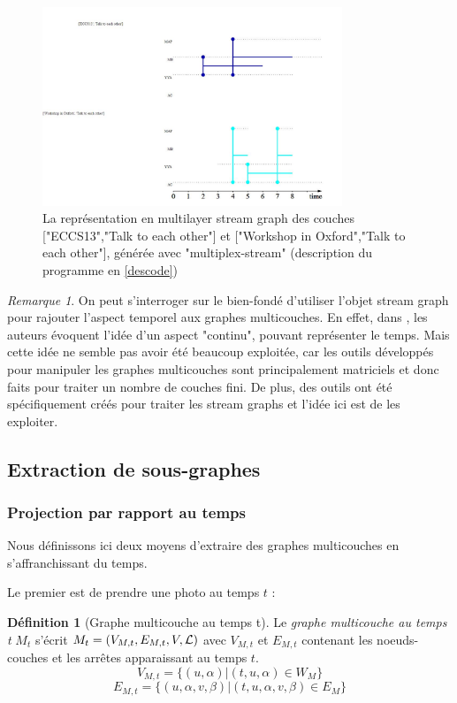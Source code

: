\documentclass[11pt,a4paper]{article}
\theoremstyle{definition}
\newtheorem{defn}{Définition}
\theoremstyle{remark}
\newtheorem{rmq}{Remarque}
\theoremstyle{remark}
\begin{document}
	\begin{figure}[H]
		\centering
		\includegraphics[width=0.8\textwidth]{exMultiStream.JPG}
		\caption{La représentation en multilayer stream graph des couches ["ECCS13","Talk to each other"] et ["Workshop in Oxford","Talk to each other"], générée avec "multiplex-stream" (description du programme en \cref{descode})}
	\end{figure}
	
	\begin{rmq}
		On peut s'interroger sur le bien-fondé d'utiliser l'objet stream graph pour rajouter l'aspect temporel aux graphes multicouches. En effet, dans \cite{mlkiv}, les auteurs évoquent l'idée d'un aspect "continu", pouvant représenter le temps. Mais cette idée ne semble pas avoir été beaucoup exploitée, car les outils développés pour manipuler les graphes multicouches sont principalement matriciels et donc faits pour traiter un nombre de couches fini. De plus, des outils ont été spécifiquement créés pour traiter les stream graphs et l'idée ici est de les exploiter.
	
	\end{rmq}

\subsection{Extraction de sous-graphes}
\label{sousgraphes}
\subsubsection{Projection par rapport au temps}
	Nous définissons ici deux moyens d'extraire des graphes multicouches en s'affranchissant du temps.
	
	Le premier est de \og prendre une photo \fg{} au temps $t$ :
	\begin{defn}[Graphe multicouche au temps t]
   	Le {\em graphe multicouche au temps t} $M_t$ s'écrit $M_t = (V_{M,t}, E_{M,t},V,{\cal L})$ avec $V_{M,t}$ et $E_{M,t}$ contenant les noeuds-couches et les arrêtes apparaissant au temps $t$.
   	$$ V_{M,t} = \{ (u,\alpha) | (t,u,\alpha) \in W_M\} $$
   	$$ E_{M,t} = \{(u,\alpha,v,\beta) | (t,u,\alpha,v,\beta) \in E_M\}$$

   \end{defn}
\end{document}
